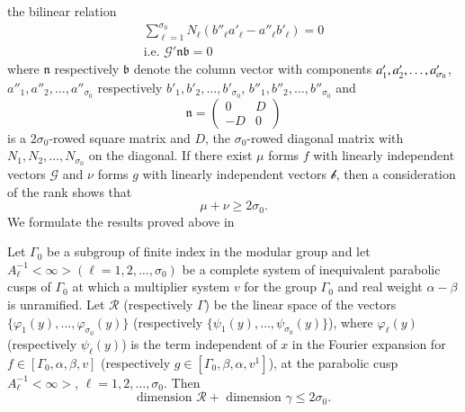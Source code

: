 the bilinear relation
\begin{gather*}
\sum^{\sigma_0}_{\ell=1} N_{\ell} (b''_{\ell}a'_{\ell} -
a''_{\ell}b'_{\ell}) =0 \\
\text{i.e. } \mathcal{G}' \mathfrak{n} \mathfrak{b}
=0 
\end{gather*}
where $\mathfrak{n}$ respectively $\mathfrak{b}$ denote the column
vector with components $a'_1, a'_2,\break\ldots, a'_{\sigma_0}$, $a''_1,
a''_2, \ldots, a''_{\sigma_0}$ respectively $b'_1, b'_2, \ldots,
b'_{\sigma_0}$, $b''_1, b''_2, \ldots, b''_{\sigma_0}$ and
$$
\mathfrak{n} = \begin{pmatrix}
0&D\\-D&0
\end{pmatrix}
$$
is a $2\sigma_0$-rowed square matrix and $D$, the $\sigma_0$-rowed
diagonal matrix with \pageoriginale $N_1, N_2, \ldots, N_{\sigma_0}$
on the diagonal. If there exist $\mu$ forms $f$ with linearly
independent vectors $\mathscr{G}$ and $\nu$ forms $g$ with linearly
independent vectors $\mathscr{b}$, then a consideration of the rank
shows that 
$$
\mu+\nu\geq 2\sigma_0.
$$
We formulate the results proved above in

\begin{thm}\label{chap4:thm29}
Let $\Gamma_0$ be a subgroup of finite index in the modular group and
let $A^{-1}_{\ell}<\infty>(\ell=1,2,\ldots,\sigma_0)$ be a complete
system of inequivalent parabolic cusps of $\Gamma_0$ at which a
multiplier system $v$ for the group $\Gamma_0$ and real weight
$\alpha-\beta$ is unramified. Let $\mathscr{R}$ (respectively
$\Gamma$) be the linear space of the vectors $\{\varphi_1(y), \ldots,
\varphi_{\sigma_0}(y)\}$ (respectively $\{\psi_1(y), \ldots,
\psi_{\sigma_0}(y)\}$), where $\varphi_{\ell}(y)$ (respectively
$\psi_{\ell}(y)$) is the term independent of $x$ in the Fourier
expansion for $f\in[\Gamma_0, \alpha, \beta, v]$ (respectively
$g\in [\Gamma_0, \beta, \alpha, v^{1}]$), at the parabolic cusp
$A^{-1}_{\ell}<\infty>$, $\ell=1,2,\ldots, \sigma_0$. Then
$$
\text{dimension } \mathscr{R} + \text{ dimension } \gamma \leq 2 \sigma_0.
$$
\end{thm}

